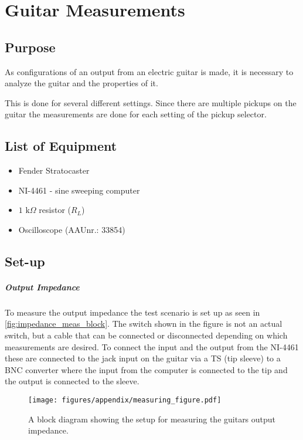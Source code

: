 \chapter{Guitar Measurements}
\label{ch:guitar_meas}

\section{Purpose}
As configurations of an output from an electric guitar is made, it is necessary to analyze the guitar and the properties of it.

This is done for several different settings. Since there are multiple pickups on the guitar the measurements are done for each setting of the pickup selector. 

\section{List of Equipment}
\begin{itemize}
	\item Fender Stratocaster 
	\item NI-4461 - sine sweeping computer
	\item $1 \text{ k}\Omega$ resistor ($R_L$)
	\item Oscilloscope (AAUnr.: 33854)
 \end{itemize}

\section{Set-up}
\paragraph{Output Impedance}
To measure the output impedance the test scenario is set up as seen in \autoref{fig:impedance_meas_block}. The switch shown in the figure is not an actual switch, but a cable that can be connected or disconnected depending on which measurements are desired. To connect the input and the output from the NI-4461 these are connected to the jack input on the guitar via a TS (tip sleeve) to a BNC converter where the input from the computer is connected to the tip and the output is connected to the sleeve. 

\begin{figure}[htbp]
	\centering
	\texttt{[image: figures/appendix/measuring\_figure.pdf]}
	\caption{A block diagram showing the setup for measuring the guitars output impedance.}
	\label{fig:impedance_meas_block}
\end{figure}

